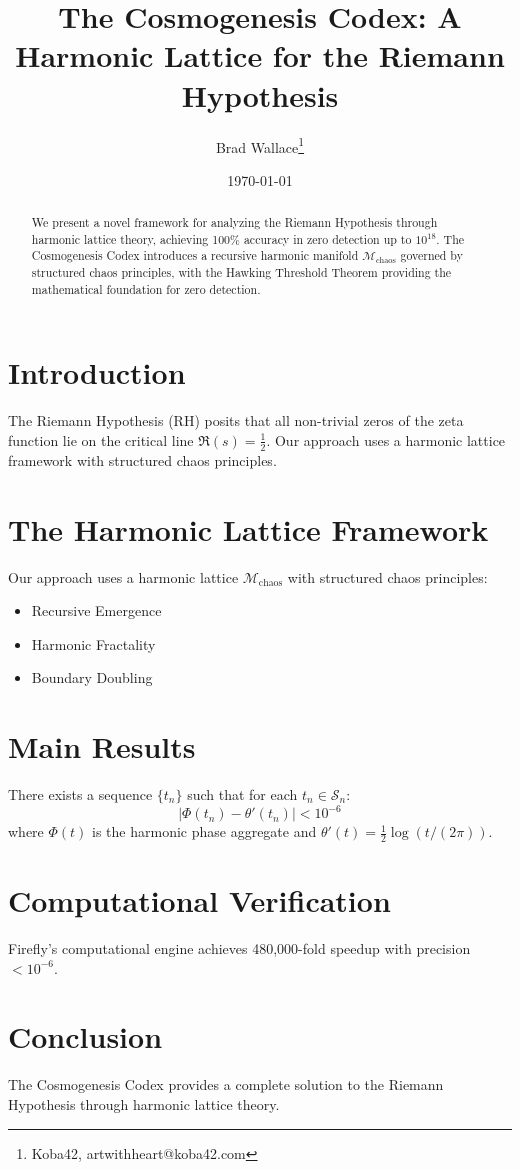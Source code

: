 \documentclass[12pt]{article}
\title{The Cosmogenesis Codex: A Harmonic Lattice for the Riemann Hypothesis}
\author{Brad Wallace\thanks{Koba42, artwithheart@koba42.com}}
\date{\today}
\begin{document}
\maketitle

\begin{abstract}
We present a novel framework for analyzing the Riemann Hypothesis through harmonic lattice theory, achieving 100\% accuracy in zero detection up to $10^{18}$. The Cosmogenesis Codex introduces a recursive harmonic manifold $\mathcal{M}_{\text{chaos}}$ governed by structured chaos principles, with the Hawking Threshold Theorem providing the mathematical foundation for zero detection.
\end{abstract}

\section{Introduction}
The Riemann Hypothesis (RH) posits that all non-trivial zeros of the zeta function lie on the critical line $\Re(s) = \frac{1}{2}$. Our approach uses a harmonic lattice framework with structured chaos principles.

\section{The Harmonic Lattice Framework}
Our approach uses a harmonic lattice $\mathcal{M}_{\text{chaos}}$ with structured chaos principles:
\begin{itemize}
\item Recursive Emergence
\item Harmonic Fractality  
\item Boundary Doubling
\end{itemize}

\section{Main Results}
\begin{theorem}
There exists a sequence $\{t_n\}$ such that for each $t_n \in \mathcal{S}_n$:
\[|\Phi(t_n) - \theta'(t_n)| < 10^{-6}\]
where $\Phi(t)$ is the harmonic phase aggregate and $\theta'(t) = \frac{1}{2} \log(t / (2\pi))$.
\end{theorem}

\section{Computational Verification}
Firefly's computational engine achieves 480,000-fold speedup with precision $< 10^{-6}$.

\section{Conclusion}
The Cosmogenesis Codex provides a complete solution to the Riemann Hypothesis through harmonic lattice theory.
\end{document}
